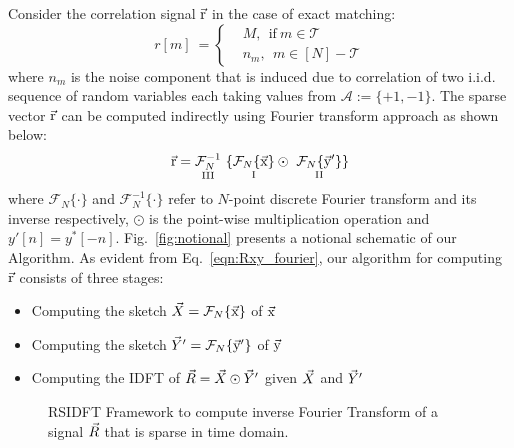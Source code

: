 Consider the correlation signal $\vec{\mathrm{r}}$ in the case of exact matching:
\begin{equation} \label{eqn:RXY_sparse}
r[m] \ = \left\{
\begin{array}{ll}
  &M,~~  \text{if} \ m \in \mathcal{T} \\
  & n_m,~~ m \in [N]-\mathcal{T}
\end{array}
\right.
\end{equation}
where $n_m$ is the noise component that is induced due to correlation of two i.i.d. sequence of random variables each taking values from $\mathcal{A} := \{+1,-1\}$. The sparse vector $\vec{\mathrm{r}}$ can be computed indirectly using Fourier transform approach as shown below:
\begin{equation}\label{eqn:Rxy_fourier}
  \rv = \underset{\text{ \RNum{3} } } {\mathcal{F}_{N}^{-1}} \ \{ \underset{\text{ \RNum{1} } }{  \mathcal{F}_{N}\{\xv\}}  \odot \ \underset{\text{ \RNum{2} } }{ \mathcal{F}_{N}\{\yv'\}}  \}
\end{equation}
where $\mathcal{F}_{N}\{ \cdot \}$ and $\mathcal{F}_{N}^{-1}\{ \cdot \}$ refer to $N$-point discrete Fourier transform and its inverse respectively, $\odot$ is the point-wise multiplication operation and ${ y'[n]} = { y^{*}[-n]}$. Fig.~\ref{fig:notional} presents a notional schematic of our Algorithm. As evident from Eq.~\eqref{eqn:Rxy_fourier}, our algorithm for computing $\vec{\mathrm{r}}$ consists of three stages:
\begin{itemize}
\item Computing the sketch $\vec{X}=\mathcal{F}_{N}\{\vec{\mathrm{x}}\}$ of $\vec{\mathrm{x}}$
\item Computing the sketch $\vec{Y}'=\mathcal{F}_{N}\{\vec{\mathrm{y}}'\}$ of $\vec{\mathrm{y}}$
\item Computing the IDFT of $\vec{R}=\vec{X} \odot \vec{Y}'$ given $\vec{X}$ and $\vec{Y}'$
\end{itemize}


	 \begin{figure}[t!]
	 	\begin{center}
	 	\resizebox{0.45\textwidth}{!}{}
	 	\end{center}	
	 	\caption{ RSIDFT Framework to compute inverse Fourier Transform of a signal $\vec{R}$ that is sparse in time domain. }\label{fig:rsidft}
	\vspace{5 pt}
	 \end{figure}


